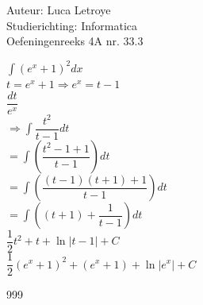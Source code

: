 \documentclass[a4paper]{article}
\begin{document}
  
\noindent \large Auteur: Luca Letroye \\
\noindent \large Studierichting: Informatica\\
\noindent \large Oefeningenreeks 4A nr. 33.3

\medskip
\normalsize

$\displaystyle\int (e^x+1)^2dx $\\

$t = e^x +1 \Rightarrow e^x = t-1$\\

$\dfrac{dt}{e^x}$\\

$\Rightarrow \displaystyle\int \dfrac{t^2}{t-1}dt $\\

$= \displaystyle\int \left(\dfrac{t^2-1+1}{t-1}\right)dt $\\

$= \displaystyle\int \left(\dfrac{(t-1)(t+1)+1}{t-1}\right)dt $\\

$= \displaystyle\int  \left((t+1)+ \dfrac{1}{t-1}\right)dt $\\

$\dfrac{1}{2}t^2+t+\ln|t-1|+C$\\

$\dfrac{1}{2}(e^x+1)^2+(e^x+1)+\ln|e^x|+C$\\



\begin{thebibliography}{999}
\end{thebibliography}
\end{document}
